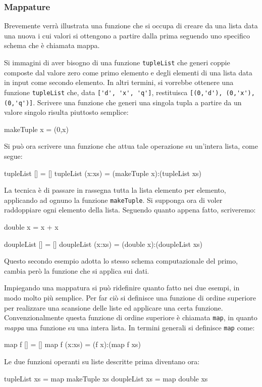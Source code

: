 \subsubsection{Mappature}
Brevemente verr\`{a} illustrata una funzione che si occupa di creare da una lista data una 
nuova i cui valori si ottengono a partire dalla prima seguendo uno 
specifico schema che \`e chiamata mappa.

Si immagini di aver bisogno di una funzione \verb"tupleList" 
che generi coppie composte dal valore zero come primo elemento e degli 
elementi di una lista data in input come secondo elemento. In altri 
termini, si vorrebbe ottenere una funzione \verb"tupleList" che, data 
\verb"['d', 'x', 'q']", restituisca \verb"[(0,'d'), (0,'x'), (0,'q')]".
Scrivere una funzione che generi una singola tupla a partire da un valore 
singolo risulta piuttosto semplice:
\begin{haskellCode}
makeTuple x = (0,x)
\end{haskellCode}
Si pu\`o ora scrivere una funzione che attua tale operazione su un'intera 
lista, come segue:
\begin{haskellCode}
tupleList []     = []
tupleList (x:xs) = (makeTuple x):(tupleList xs)
\end{haskellCode}
La tecnica \`e di passare in rassegna tutta la lista elemento per 
elemento, applicando ad ognuno la  funzione \verb"makeTuple". Si supponga 
ora di voler raddoppiare ogni elemento della lista. Seguendo quanto appena 
fatto, scriveremo:
\begin{haskellCode}
double x          = x + x

doupleList []     = []
doupleList (x:xs) = (double x):(doupleList xs)
\end{haskellCode}
Questo secondo esempio adotta lo stesso schema computazionale del primo, 
cambia per\`o la funzione che si applica sui dati.

Impiegando una mappatura si pu\`{o} ridefinire quanto fatto nei due esempi, 
in modo molto pi\`u semplice. Per far ci\`o si definisce una funzione di 
ordine superiore per realizzare una scansione delle liste ed applicare una 
certa funzione. Convenzionalmente questa funzione di ordine 
superiore \`{e} chiamata \verb"map", in quanto \emph{mappa} una funzione su una intera 
lista. In termini generali si definisce \verb"map" come:
\begin{haskellCode}
map f []     = []
map f (x:xs) = (f x):(map f xs)
\end{haskellCode}
Le due funzioni operanti su liste descritte prima diventano ora:
\begin{haskellCode}
tupleList   xs = map makeTuple xs
doupleList  xs = map double xs
\end{haskellCode}

